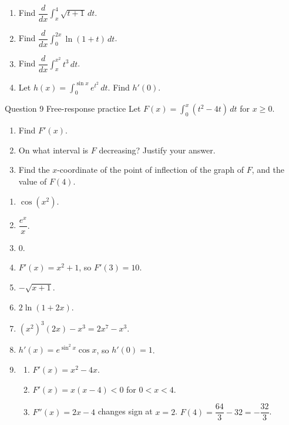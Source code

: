 \documentclass[11pt]{article}
\begin{document}
\begin{enumerate}[leftmargin=*,itemsep=2pt,start=5]
  \item Find $\dfrac{d}{dx}\displaystyle\int_{x}^{4}\sqrt{t+1}\,dt$.\work{2.8cm}
  \item Find $\dfrac{d}{dx}\displaystyle\int_{0}^{2x}\ln(1+t)\,dt$.\work{2.8cm}
  \item Find $\dfrac{d}{dx}\displaystyle\int_{x}^{x^2}t^3\,dt$.\work{2.8cm}
  \item Let $h(x)=\displaystyle\int_{0}^{\sin x}e^{t^2}\,dt$. Find $h'(0)$.\work{2.8cm}
\end{enumerate}

\begin{frbox}{Question 9 \textperiodcentered{} Free-response practice}
Let $F(x)=\displaystyle\int_{0}^{x}\left(t^2-4t\right)\,dt$ for $x\ge0$.
\begin{enumerate}[label=(\alph*),leftmargin=*,itemsep=2pt]
  \item Find $F'(x)$.\work{2.6cm}
  \item On what interval is $F$ decreasing? Justify your answer.\work{2.6cm}
  \item Find the $x$-coordinate of the point of inflection of the graph of $F$, and the value of $F(4)$.\work{2.6cm}
\end{enumerate}
\end{frbox}

\newpage
\begin{solbox}
\begin{enumerate}[leftmargin=*,itemsep=4pt]
  \item $\cos\!\left(x^2\right)$.
  \item $\dfrac{e^{x}}{x}$.
  \item $0$.
  \item $F'(x)=x^2+1$, so $F'(3)=10$.
  \item $-\sqrt{x+1}$.
  \item $2\ln(1+2x)$.
  \item $\left(x^2\right)^3(2x)-x^3=2x^7-x^3$.
  \item $h'(x)=e^{\sin^2x}\cos x$, so $h'(0)=1$.
  \item \begin{enumerate}[label=(\alph*),leftmargin=*,itemsep=3pt]
    \item $F'(x)=x^2-4x$.
    \item $F'(x)=x(x-4)<0$ for $0<x<4$.
    \item $F''(x)=2x-4$ changes sign at $x=2$. $F(4)=\dfrac{64}{3}-32=-\dfrac{32}{3}$.
  \end{enumerate}
\end{enumerate}
\end{solbox}
\end{document}
